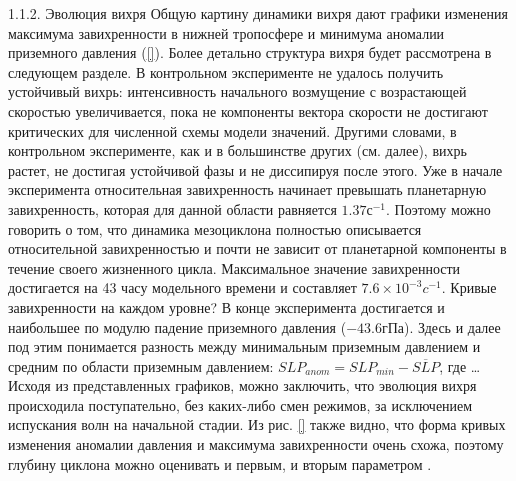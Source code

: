 1.1.2.	Эволюция вихря
Общую картину динамики вихря дают графики изменения максимума завихренности в нижней тропосфере и минимума аномалии приземного давления (\ref{}). Более детально структура вихря будет рассмотрена в следующем разделе. В контрольном эксперименте не удалось получить устойчивый вихрь: интенсивность начального возмущение с возрастающей скоростью увеличивается, пока не компоненты вектора скорости не достигают критических для численной схемы модели значений. Другими словами, в контрольном эксперименте, как и в большинстве других (см. далее), вихрь растет, не достигая устойчивой фазы и не диссипируя после этого.
Уже в начале эксперимента относительная завихренность начинает превышать планетарную завихренность, которая для данной области равняется $1.37 с^{-1}$. Поэтому можно говорить о том, что динамика мезоциклона полностью описывается относительной завихренностью и почти не зависит от планетарной компоненты в течение своего жизненного цикла. Максимальное значение завихренности достигается на 43 часу модельного времени и составляет $7.6\times 10^{-3} c^{-1}$. 
Кривые завихренности на каждом уровне?
В конце эксперимента достигается и наибольшее по модулю падение приземного давления ($-43.6 гПа$). Здесь и далее под этим понимается разность между минимальным приземным давлением и средним по области приземным давлением:
$SLP_{anom}=SLP_{min}-\overbar{SLP}$,
где …
Исходя из представленных графиков, можно заключить, что эволюция вихря происходила поступательно, без каких-либо смен режимов, за исключением испускания волн на начальной стадии.
Из рис. \ref{} также видно, что форма кривых изменения аномалии давления и максимума завихренности очень схожа, поэтому глубину циклона можно оценивать и первым, и вторым параметром \cite{YanaseEtAl2004}.

